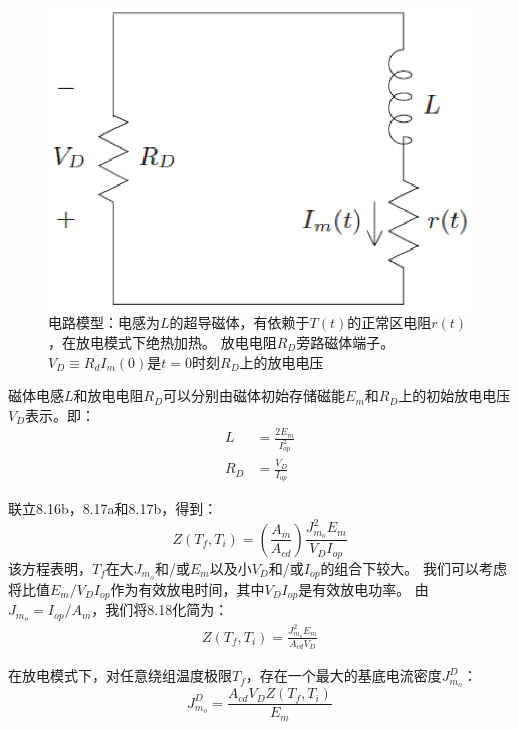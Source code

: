 \begin{figure}
\centering
\includegraphics[scale=0.5]{chpt8/figs/fig8.3.eps}
\caption{电路模型：电感为$L$的超导磁体，有依赖于$T(t)$的正常区电阻$r(t)$，在放电模式下绝热加热。
	放电电阻$R_D$旁路磁体端子。$V_D\equiv R_d I_m(0)$是$t=0$时刻$R_D$上的放电电压}
\end{figure}

磁体电感$L$和放电电阻$R_D$可以分别由磁体初始存储磁能$E_m$和$R_D$上的初始放电电压$V_D$表示。即：
\begin{subequations}
	\begin{align}
	L&=\frac{2E_m}{I_{op}^{2}}\\
	R_D&=\frac{V_D}{I_{op}}
	\end{align}
\end{subequations}

联立8.16b，8.17a和8.17b，得到：
\begin{equation}%
Z(T_f,T_i)=\left(\frac{A_m}{A_{cd}}\right)\frac{J_{m_o}^{2}E_m}{V_DI_{op}}
\end{equation}
该方程表明，$T_f$在大$J_{m_o}$和/或$E_m$以及小$V_D$和/或$I_{op}$的组合下较大。
我们可以考虑将比值$E_m/V_D I_{op}$作为有效放电时间，其中$V_D I_{op}$是有效放电功率。
由$J_{m_o}=I_{op}/A_m$，我们将8.18化简为：
\begin{align*}%
Z(T_f,T_i)=\frac{J_{m_o}^{2}E_m}{A_{cd}V_D} \tag{8.18b}
\end{align*}

在放电模式下，对任意绕组温度极限$T_f$，存在一个最大的基底电流密度$J_{m_o}^D$：
\begin{equation}%
J_{m_o}^{D}=\frac{A_{cd}V_DZ(T_f,T_i)}{E_m}
\end{equation}

